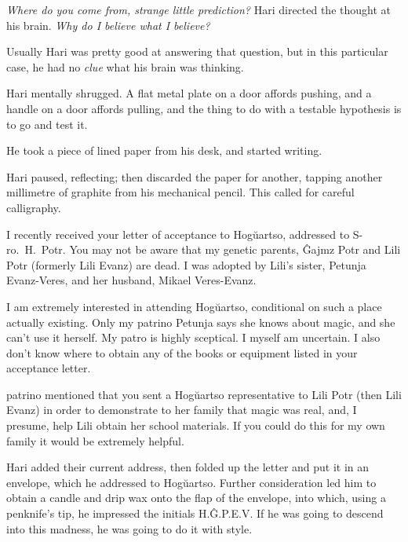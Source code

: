 \emph{Where do you come from, strange little prediction?} Hari directed the thought at his brain. \emph{Why do I believe what I believe?}

Usually Hari was pretty good at answering that question, but in this particular case, he had no \emph{clue} what his brain was thinking.

Hari mentally shrugged. A flat metal plate on a door affords pushing, and a handle on a door affords pulling, and the thing to do with a testable hypothesis is to go and test it.

He took a piece of lined paper from his desk, and started writing.

\begin{writtenNote}
\end{writtenNote}

Hari paused, reflecting; then discarded the paper for another, tapping another millimetre of graphite from his mechanical pencil. This called for careful calligraphy.

\begin{writtenNote}


I recently received your letter of acceptance to Hogŭartso, addressed to S\nobreakdash-ro.~H.~Potr. You may not be aware that my genetic parents, Ĝajmz Potr and Lili Potr (formerly Lili Evanz) are dead. I was adopted by Lili’s sister, Petunja Evanz-Veres, and her husband, Mikael Veres-Evanz.

I am extremely interested in attending Hogŭartso, conditional on such a place actually existing. Only my patrino Petunja says she knows about magic, and she can’t use it herself. My patro is highly sceptical. I myself am uncertain. I also don’t know where to obtain any of the books or equipment listed in your acceptance letter.

patrino mentioned that you sent a Hogŭartso representative to Lili Potr (then Lili Evanz) in order to demonstrate to her family that magic was real, and, I presume, help Lili obtain her school materials. If you could do this for my own family it would be extremely helpful.

\end{writtenNote}

Hari added their current address, then folded up the letter and put it in an envelope, which he addressed to Hogŭartso. Further consideration led him to obtain a candle and drip wax onto the flap of the envelope, into which, using a penknife’s tip, he impressed the initials H.Ĝ.P.E.V\@. If he was going to descend into this madness, he was going to do it with style.

